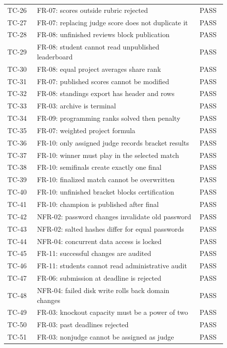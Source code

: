 \begin{longtable}{p{0.12\linewidth}p{0.66\linewidth}p{0.1\linewidth}}
TC-26 & FR-07: scores outside rubric rejected & PASS\\
TC-27 & FR-07: replacing judge score does not duplicate it & PASS\\
TC-28 & FR-08: unfinished reviews block publication & PASS\\
TC-29 & FR-08: student cannot read unpublished leaderboard & PASS\\
TC-30 & FR-08: equal project averages share rank & PASS\\
TC-31 & FR-07: published scores cannot be modified & PASS\\
TC-32 & FR-08: standings export has header and rows & PASS\\
TC-33 & FR-03: archive is terminal & PASS\\
TC-34 & FR-09: programming ranks solved then penalty & PASS\\
TC-35 & FR-07: weighted project formula & PASS\\
TC-36 & FR-10: only assigned judge records bracket results & PASS\\
TC-37 & FR-10: winner must play in the selected match & PASS\\
TC-38 & FR-10: semifinals create exactly one final & PASS\\
TC-39 & FR-10: finalized match cannot be overwritten & PASS\\
TC-40 & FR-10: unfinished bracket blocks certification & PASS\\
TC-41 & FR-10: champion is published after final & PASS\\
TC-42 & NFR-02: password changes invalidate old password & PASS\\
TC-43 & NFR-02: salted hashes differ for equal passwords & PASS\\
TC-44 & NFR-04: concurrent data access is locked & PASS\\
TC-45 & FR-11: successful changes are audited & PASS\\
TC-46 & FR-11: students cannot read administrative audit & PASS\\
TC-47 & FR-06: submission at deadline is rejected & PASS\\
TC-48 & NFR-04: failed disk write rolls back domain changes & PASS\\
TC-49 & FR-03: knockout capacity must be a power of two & PASS\\
TC-50 & FR-03: past deadlines rejected & PASS\\
TC-51 & FR-03: nonjudge cannot be assigned as judge & PASS\\

\end{longtable}
